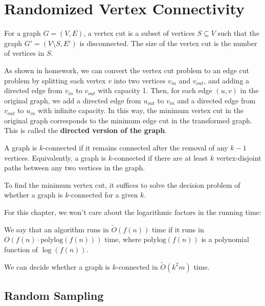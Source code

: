 \chapter{Randomized Vertex Connectivity}

\begin{definition}
	For a graph $G = (V, E)$, a vertex cut is a subset of vertices $S \subseteq V$ such that the graph $G' = (V \setminus S, E')$ is disconnected. The size of the vertex cut is the number of vertices in $S$.
\end{definition}

As shown in homework, we can convert the vertex cut problem to an edge cut problem by splitting each vertex $v$ into two vertices $v_{in}$ and $v_{out}$, and adding a directed edge from $v_{in}$ to $v_{out}$ with capacity 1. Then, for each edge $(u, v)$ in the original graph, we add a directed edge from $u_{out}$ to $v_{in}$ and a directed edge from $v_{out}$ to $u_{in}$ with infinite capacity. In this way, the minimum vertex cut in the original graph corresponds to the minimum edge cut in the transformed graph. This is called the \textbf{directed version of the graph}.

\begin{definition}[$k$-connectivity]
	A graph is $k$-connected if it remains connected after the removal of any $k-1$ vertices. Equivalently, a graph is $k$-connected if there are at least $k$ vertex-disjoint paths between any two vertices in the graph.
\end{definition}

To find the minimum vertex cut, it suffices to solve the decision problem of whether a graph is $k$-connected for a given $k$.

For this chapter, we won't care about the logarithmic factors in the running time:

\begin{definition}
	We say that an algorithm runs in $\tilde{O}(f(n))$ time if it runs in $O(f(n) \cdot \text{polylog}(f(n)))$ time, where $\text{polylog}(f(n))$ is a polynomial function of $\log(f(n))$.
\end{definition}

\begin{theorem}\label{thm:vertex-cut}
	We can decide whether a graph is $k$-connected in $\tilde{O}(k^2 m)$ time.
\end{theorem}

\section{Random Sampling}

